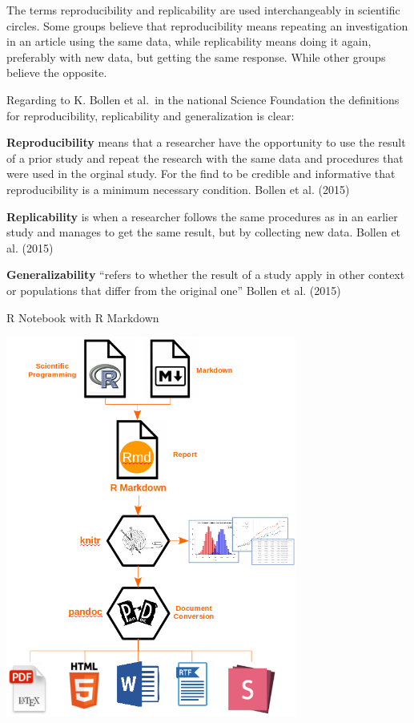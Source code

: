 \documentclass[
]{article}
\begin{document}
The terms reproducibility and replicability are used interchangeably in
scientific circles. Some groups believe that reproducibility means
repeating an investigation in an article using the same data, while
replicability means doing it again, preferably with new data, but
getting the same response. While other groups believe the opposite.

Regarding to K. Bollen et al.~in the national Science Foundation the
definitions for reproducibility, replicability and generalization is
clear:

\textbf{Reproducibility} means that a researcher have the opportunity to
use the result of a prior study and repeat the research with the same
data and procedures that were used in the orginal study. For the find to
be credible and informative that reproducibility is a minimum necessary
condition. Bollen et al. (2015)

\textbf{Replicability} is when a researcher follows the same procedures
as in an earlier study and manages to get the same result, but by
collecting new data. Bollen et al. (2015)

\textbf{Generalizability} ``refers to whether the result of a study
apply in other context or populations that differ from the original
one'' Bollen et al. (2015)

R Notebook with R Markdown

\includegraphics[width=3.76042in,height=\textheight]{rmarkdown_workflow.png}
\end{document}
